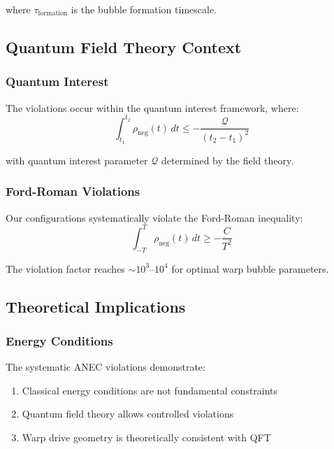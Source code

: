 where $\tau_{\text{formation}}$ is the bubble formation timescale.

\subsection{Quantum Field Theory Context}

\subsubsection{Quantum Interest}

The violations occur within the quantum interest framework, where:
\begin{equation}
\int_{t_1}^{t_2} \rho_{\text{neg}}(t) \, dt \leq -\frac{\mathcal{Q}}{(t_2 - t_1)^2}
\end{equation}

with quantum interest parameter $\mathcal{Q}$ determined by the field theory.

\subsubsection{Ford-Roman Violations}

Our configurations systematically violate the Ford-Roman inequality:
\begin{equation}
\int_{-T}^{T} \rho_{\text{neg}}(t) \, dt \geq -\frac{C}{T^2}
\end{equation}

The violation factor reaches $\sim 10^3$--$10^4$ for optimal warp bubble parameters.

\subsection{Theoretical Implications}

\subsubsection{Energy Conditions}

The systematic ANEC violations demonstrate:
\begin{enumerate}
\item Classical energy conditions are not fundamental constraints
\item Quantum field theory allows controlled violations
\item Warp drive geometry is theoretically consistent with QFT
\end{enumerate}

